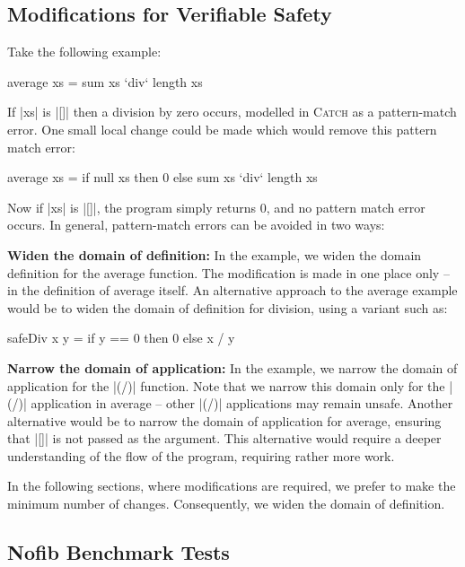 \documentclass[preprint]{sigplanconf}
\newcommand{\C}[1]{\textsf{#1}}
\newcommand{\catch}{\textsc{Catch}}
\newcommand{\para}[1]{\vspace{2mm}\noindent\textbf{#1}}
\begin{document}
\subsection{Modifications for Verifiable Safety}
\label{sec:safety}

Take the following example:

\begin{code}
average xs = sum xs `div` length xs
\end{code}

If |xs| is |[]| then a division by zero occurs, modelled in \catch{} as a pattern-match error. One small local change could be made which would remove this pattern match error:

\begin{code}
average xs = if null xs then 0 else sum xs `div` length xs
\end{code}

\noindent Now if |xs| is |[]|, the program simply returns 0, and no pattern match error occurs. In general, pattern-match errors can be avoided in two ways:

\para{Widen the domain of definition:} In the example, we widen the domain definition for the \C{average} function. The modification is made in one place only -- in the definition of \C{average} itself. An alternative approach to the \C{average} example would be to widen the domain of definition for division, using a variant such as:

\begin{code}
safeDiv x y = if y == 0 then 0 else x / y
\end{code}


\para{Narrow the domain of application:} In the example, we narrow the domain of application for the |(/)| function.  Note that we narrow this domain only for the |(/)| application in \C{average} -- other |(/)| applications may remain unsafe. Another alternative would be to narrow the domain of application for \C{average}, ensuring that |[]| is not passed as the argument. This alternative would require a deeper understanding of the flow of the program, requiring rather more work.

In the following sections, where modifications are required, we prefer to make the minimum number of changes. Consequently, we widen the domain of definition.

\subsection{Nofib Benchmark Tests}
\label{sec:imaginary}
\end{document}
